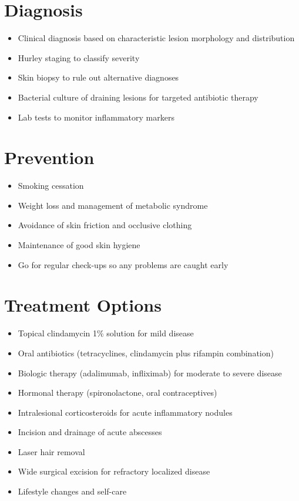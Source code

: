 \section{Diagnosis}

\begin{itemize}[noitemsep]
  \item Clinical diagnosis based on characteristic lesion morphology and distribution
  \item Hurley staging to classify severity
  \item Skin biopsy to rule out alternative diagnoses
  \item Bacterial culture of draining lesions for targeted antibiotic therapy
  \item Lab tests to monitor inflammatory markers
\end{itemize}

\section{Prevention}

\begin{itemize}[noitemsep]
  \item Smoking cessation
  \item Weight loss and management of metabolic syndrome
  \item Avoidance of skin friction and occlusive clothing
  \item Maintenance of good skin hygiene
  \item Go for regular check-ups so any problems are caught early
\end{itemize}

\section{Treatment Options}

\begin{itemize}[noitemsep]
  \item Topical clindamycin 1\% solution for mild disease
  \item Oral antibiotics (tetracyclines, clindamycin plus rifampin combination)
  \item Biologic therapy (adalimumab, infliximab) for moderate to severe disease
  \item Hormonal therapy (spironolactone, oral contraceptives)
  \item Intralesional corticosteroids for acute inflammatory nodules
  \item Incision and drainage of acute abscesses
  \item Laser hair removal
  \item Wide surgical excision for refractory localized disease
  \item Lifestyle changes and self-care
\end{itemize}

